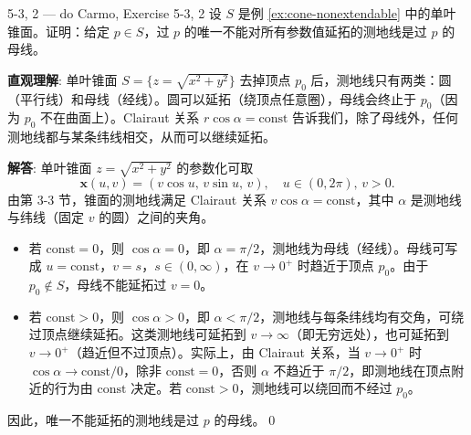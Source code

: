 \begin{exercise}{5-3, 2 — do Carmo, Exercise 5-3, 2}
设 $S$ 是例 \ref{ex:cone-nonextendable} 中的单叶锥面。证明：给定 $p \in S$，过 $p$ 的唯一不能对所有参数值延拓的测地线是过 $p$ 的母线。
\end{exercise}
\begin{solution}
\textbf{直观理解}: 单叶锥面 $S = \{z = \sqrt{x^2+y^2}\}$ 去掉顶点 $p_0$ 后，测地线只有两类：圆（平行线）和母线（经线）。圆可以延拓（绕顶点任意圈），母线会终止于 $p_0$（因为 $p_0$ 不在曲面上）。Clairaut 关系 $r\cos\alpha = \mathrm{const}$ 告诉我们，除了母线外，任何测地线都与某条纬线相交，从而可以继续延拓。

\textbf{解答}: 单叶锥面 $z = \sqrt{x^2+y^2}$ 的参数化可取
\[
\mathbf{x}(u,v) = (v\cos u,\, v\sin u,\, v),\quad u\in(0,2\pi),\, v>0.
\]
由第 3-3 节，锥面的测地线满足 Clairaut 关系 $v\cos\alpha = \mathrm{const}$，其中 $\alpha$ 是测地线与纬线（固定 $v$ 的圆）之间的夹角。
\begin{itemize}
  \item 若 $\mathrm{const} = 0$，则 $\cos\alpha=0$，即 $\alpha=\pi/2$，测地线为母线（经线）。母线可写成 $u=\mathrm{const}$，$v=s$，$s\in(0,\infty)$，在 $v\to 0^+$ 时趋近于顶点 $p_0$。由于 $p_0 \notin S$，母线不能延拓过 $v=0$。
  \item 若 $\mathrm{const} > 0$，则 $\cos\alpha > 0$，即 $\alpha < \pi/2$，测地线与每条纬线均有交角，可绕过顶点继续延拓。这类测地线可延拓到 $v\to\infty$（即无穷远处），也可延拓到 $v\to 0^+$（趋近但不过顶点）。实际上，由 Clairaut 关系，当 $v\to 0^+$ 时 $\cos\alpha \to \mathrm{const}/0$，除非 $\mathrm{const}=0$，否则 $\alpha$ 不趋近于 $\pi/2$，即测地线在顶点附近的行为由 $\mathrm{const}$ 决定。若 $\mathrm{const}>0$，测地线可以绕回而不经过 $p_0$。
\end{itemize}
因此，唯一不能延拓的测地线是过 $p$ 的母线。\qed
\end{solution}

